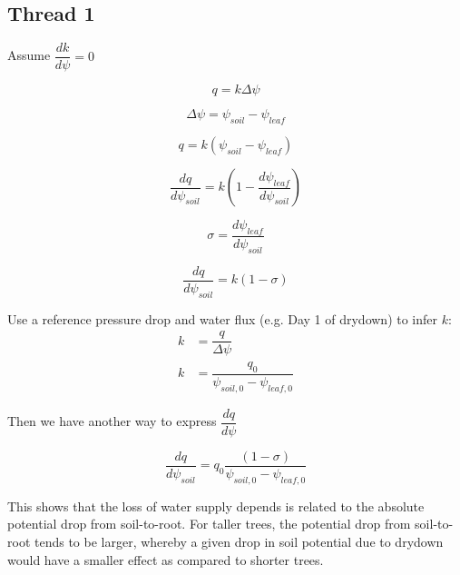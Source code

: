 \documentclass[11pt]{article}
\begin{document}
\subsection{Thread 1}

Assume $\dfrac{dk}{d\psi}=0$

\begin{equation}
q = k\Delta{\psi}
\end{equation}

\begin{equation}
\Delta{\psi} = \psi_{soil}-\psi_{leaf}
\end{equation}

\begin{equation}
q = k\left(\psi_{soil}-\psi_{leaf}\right)
\end{equation}

\begin{equation}
\dfrac{dq}{d\psi_{soil}} = k\left(1-\dfrac{d\psi_{leaf}}{d\psi_{soil}} \right)
\end{equation}

\begin{equation}
\sigma = \dfrac{d\psi_{leaf}}{d\psi_{soil}}
\end{equation}

\begin{equation}
\dfrac{dq}{d\psi_{soil}} = k\left(1-\sigma \right)
\end{equation}

Use a reference pressure drop and water flux (e.g. Day 1 of drydown) to infer $k$:
\begin{equation}
\begin{aligned}
k&=\dfrac{q}{\Delta{\psi}} \\
k&=\dfrac{q_0}{\psi_{soil,0}-\psi_{leaf,0}}
\end{aligned}
\end{equation}

Then we have another way to express $\dfrac{dq}{d\psi}$

\begin{equation}
\dfrac{dq}{d\psi_{soil}} = q_0\dfrac{\left(1-\sigma \right)}{\psi_{soil,0}-\psi_{leaf,0}}
\end{equation}

This shows that the loss of water supply depends is related to the absolute potential drop from soil-to-root.
For taller trees, the potential drop from soil-to-root tends to be larger, whereby a given drop in soil potential due to drydown would have a smaller effect as compared to shorter trees.
\end{document}
